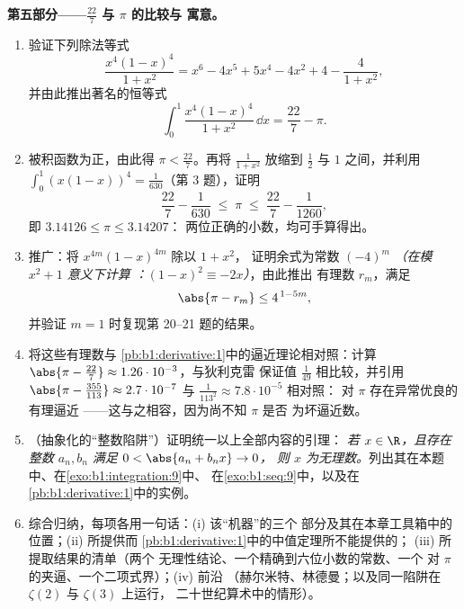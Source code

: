 \begin{problem}
\medskip
\noindent\textbf{第五部分——$\frac{22}{7}$ 与 $\pi$ 的比较与
寓意。}
\begin{enumerate}[resume]
  \item 验证下列除法等式
        \[
        \frac{x^4(1-x)^4}{1 + x^2}
        = x^6 - 4x^5 + 5x^4 - 4x^2 + 4 - \frac{4}{1 + x^2},
        \]
        并由此推出著名的恒等式
        \[
        \int_0^1 \frac{x^4 (1-x)^4}{1 + x^2}\,\dd x
        = \frac{22}{7} - \pi .
        \]
  \item 被积函数为正，由此得 $\pi <
        \frac{22}{7}$。再将 $\frac{1}{1+x^2}$ 放缩到
        $\frac12$ 与 $1$ 之间，并利用 $\int_0^1 (x(1-x))^4 =
        \frac{1}{630}$（第 3 题），证明
        \[
        \frac{22}{7} - \frac{1}{630} \;\leq\; \pi \;\leq\;
        \frac{22}{7} - \frac{1}{1260} ,
        \]
        即 $3.14126 \leq \pi \leq 3.14207$：
        两位正确的小数，均可手算得出。
  \item 推广：将 $x^{4m}(1-x)^{4m}$ 除以 $1 + x^2$，
        证明余式为常数 $(-4)^m$ \emph{（在模 $x^2 + 1$ 意义下计算
        ：$(1-x)^2 \equiv -2x$）}，由此推出
        有理数 $r_m$，满足
        \[
        \abs{\pi - r_m} \leq 4^{\,1 - 5m} ,
        \]
        并验证 $m = 1$ 时复现第 20--21 题的结果。
  \item 将这些有理数与
        \cref{pb:b1:derivative:1}中的逼近理论相对照：计算 $\abs{\pi -
        \frac{22}{7}} \approx 1.26\cdot10^{-3}$，与狄利克雷
        保证值 $\frac{1}{49}$ 相比较，并引用
        $\abs{\pi - \frac{355}{113}} \approx 2.7\cdot10^{-7}$
        与 $\frac{1}{113^2} \approx 7.8\cdot10^{-5}$ 相对照：
        对 $\pi$ 存在异常优良的有理逼近
——这与之相容，因为尚不知 $\pi$ 是否
        为坏逼近数。
  \item （抽象化的“整数陷阱”）证明统一以上全部内容的引理：
        \emph{若 $x \in \R$，且存在
        整数 $a_n, b_n$ 满足 $0 < \abs{a_n + b_n x} \to 0$，
        则 $x$ 为无理数。}列出其在本题
        中、在\cref{exo:b1:integration:9}中、
        在\cref{exo:b1:seq:9}中，以及在\cref{pb:b1:derivative:1}中的实例。
  \item 综合归纳，每项各用一句话：(i) 该“机器”的三个
        部分及其在本章工具箱中的
        位置；(ii) 所提供而
        \cref{pb:b1:derivative:1}中的中值定理所不能提供的；
        (iii) 所提取结果的清单（两个
        无理性结论、一个精确到六位小数的常数、一个
        对 $\pi$ 的夹逼、一个二项式界）；(iv) 前沿
        （赫尔米特、林德曼；以及同一陷阱在
        $\zeta(2)$ 与 $\zeta(3)$ 上运行，
        二十世纪算术中的情形）。
\end{enumerate}
\end{problem}
